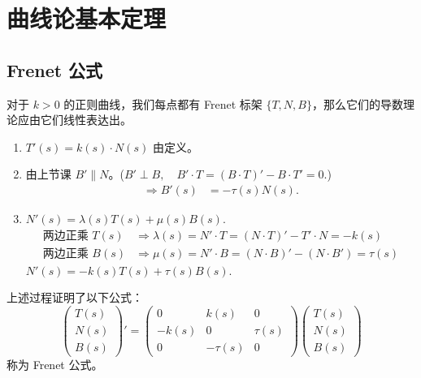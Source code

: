 \documentclass[lang=cn,10pt,thmcnt=section]{elegantbook}
\begin{document}
\section{曲线论基本定理}
\subsection{Frenet 公式}

    对于 $k > 0$ 的正则曲线，我们每点都有 Frenet 标架 $\{T, N, B\}$，那么它们的导数理论应由它们线性表达出。

    
    \begin{enumerate}
        \item $T'(s) = k(s) \cdot N(s)$ 由定义。
        \item 由上节课 $B' \parallel N$。($B' \perp B, \quad B' \cdot T = (B \cdot T)' - B \cdot T' = 0$.)
        \begin{align*}
        \Rightarrow B'(s) &= -\tau(s) N(s).
        \end{align*}
        \item $N'(s) = \lambda(s) T(s) + \mu(s) B(s)$.
        \begin{align*}
        \text{两边正乘 } T(s) &\Rightarrow \lambda(s) = N' \cdot T = (N \cdot T)' - T' \cdot N = -k(s) \\
        \text{两边正乘 } B(s) &\Rightarrow \mu(s) = N' \cdot B = (N \cdot B)' - (N \cdot B') = \tau(s)
        \end{align*}
        $N'(s) = -k(s) T(s) + \tau(s) B(s).$
    \end{enumerate}
\begin{theorem}[Frenet公式]
        上述过程证明了以下公式：
        \[
        \begin{pmatrix}
        T(s) \\
        N(s) \\
        B(s)
        \end{pmatrix}'
        =
        \begin{pmatrix}
        0 & k(s) & 0 \\
        -k(s) & 0 & \tau(s) \\
        0 & -\tau(s) & 0
        \end{pmatrix}
        \begin{pmatrix}
        T(s) \\
        N(s) \\
        B(s)
        \end{pmatrix}
        \]
        称为 Frenet 公式。
\end{theorem} 
\end{document}
